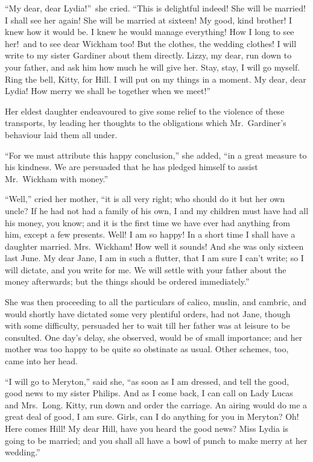 \documentclass[12pt,english]{book}
\begin{document}
{}``My dear, dear Lydia!''\ she cried. {}``This is delightful
indeed! She will be married! I shall see her again! She will be married
at sixteen! My good, kind brother! I knew how it would be. I knew
he would manage everything! How I long to see her!\ and to see dear
Wickham too! But the clothes, the wedding clothes! I will write to
my sister Gardiner about them directly. Lizzy, my dear, run down to
your father, and ask him how much he will give her. Stay, stay, I
will go myself. Ring the bell, Kitty, for Hill. I will put on my things
in a moment. My dear, dear Lydia! How merry we shall be together when
we meet!''\ 

Her eldest daughter endeavoured to give some relief to the violence
of these transports, by leading her thoughts to the obligations which
Mr.\ Gardiner's behaviour laid them all under.

{}``For we must attribute this happy conclusion,'' she added, {}``in
a great measure to his kindness. We are persuaded that he has pledged
himself to assist Mr.\ Wickham with money.''

{}``Well,'' cried her mother, {}``it is all very right; who should
do it but her own uncle? If he had not had a family of his own, I
and my children must have had all his money, you know; and it is the
first time we have ever had anything from him, except a few presents.
Well! I am so happy! In a short time I shall have a daughter married.
Mrs.\ Wickham! How well it sounds! And she was only sixteen last
June. My dear Jane, I am in such a flutter, that I am sure I can't
write; so I will dictate, and you write for me. We will settle with
your father about the money afterwards; but the things should be ordered
immediately.''

She was then proceeding to all the particulars of calico, muslin,
and cambric, and would shortly have dictated some very plentiful orders,
had not Jane, though with some difficulty, persuaded her to wait till
her father was at leisure to be consulted. One day's delay, she observed,
would be of small importance; and her mother was too happy to be quite
so obstinate as usual. Other schemes, too, came into her head.

{}``I will go to Meryton,'' said she, {}``as soon as I am dressed,
and tell the good, good news to my sister Philips. And as I come back,
I can call on Lady Lucas and Mrs.\ Long. Kitty, run down and order
the carriage. An airing would do me a great deal of good, I am sure.
Girls, can I do anything for you in Meryton? Oh! Here comes Hill!
My dear Hill, have you heard the good news? Miss Lydia is going to
be married; and you shall all have a bowl of punch to make merry at
her wedding.''
\end{document}
